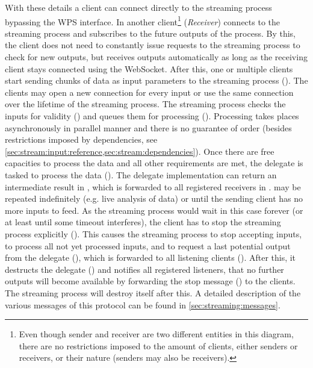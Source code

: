   With these details a client can connect directly to the streaming process bypassing the \ac{WPS} interface. In  another client\footnote{Even though sender and receiver are two different entities in this diagram, there are no restrictions imposed to the amount of clients, either senders or receivers, or their nature (senders may also be receivers).} (\emph{Receiver}) connects to the streaming process and subscribes to the future outputs of the process. By this, the client does not need to constantly issue requests to the streaming process to check for new outputs, but receives outputs automatically as long as the receiving client stays connected using the WebSocket. After this, one or multiple clients start sending chunks of data as input parameters to the streaming process (). The clients may open a new connection for every input or use the same connection over the lifetime of the streaming process. The streaming process checks the inputs for validity () and queues them for processing (). Processing takes places asynchronously in parallel manner and there is no guarantee of order (besides restrictions imposed by dependencies, see \cref{sec:stream:input:reference,sec:stream:dependencies}). Once there are free capacities to process the data and all other requirements are met, the delegate is tasked to process the data (). The delegate implementation can return an intermediate result in , which is forwarded to all registered receivers in .  may be repeated indefinitely (e.g. live analysis of data) or until the sending client has no more inputs to feed. As the streaming process would wait in this case forever (or at least until some timeout interferes), the client has to stop the streaming process explicitly (). This causes the streaming process to stop accepting inputs, to process all not yet processed inputs, and to request a last potential output from the delegate (), which is forwarded to all listening clients (). After this, it destructs the delegate () and notifies all registered listeners, that no further outputs will become available by forwarding the stop message () to the clients. The streaming process will destroy itself after this. A detailed description of the various messages of this protocol can be found in \cref{sec:streaming:messages}.

